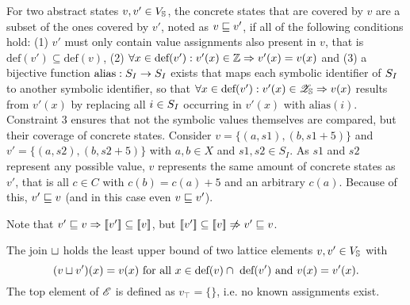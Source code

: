 For two abstract states $v, v' \in V_{\mathbb{S}}$, the concrete states that are covered by $v$ are a subset of the ones covered by $v'$, noted as $v \sqsubseteq v'$, if all of the following conditions hold:
(1) $v'$ must only contain value assignments also present in $v$, that is $\text{def}(v') \subseteq \text{def}(v)$,
(2) $\forall x \in \text{def}(v'): v'(x) \in \mathbb{Z} \Rightarrow v'(x) = v(x)$ and
(3) a bijective function $\text{alias}:S_I \rightarrow S_I$ exists
that maps each symbolic identifier of $S_I$ to another symbolic identifier,
so that $\forall x \in \text{def}(v'): v'(x) \in \mathscr{Z}_{\mathbb{S}} \Rightarrow v(x)$ results from $v'(x)$ by replacing all $i \in S_I$ occurring in $v'(x)$ with $\text{alias}(i)$.
Constraint 3 ensures that not the symbolic values themselves are compared, but their coverage of concrete states.
Consider $v = \{ (a, s1), (b, s1 + 5) \}$ and $v' = \{ (a, s2), (b, s2 + 5) \}$ with $a, b \in X$ and $s1, s2 \in S_I$. As $s1$ and $s2$ represent any possible value, $v$ represents the same amount of concrete states as $v'$, that is all $c \in C$ with $c(b) = c(a) + 5$ and an arbitrary $c(a)$. Because of this, $v' \sqsubseteq v$ (and in this case even $v \sqsubseteq v'$).

Note that $v' \sqsubseteq v \Rightarrow [\![ v' ]\!] \subseteq [\![ v ]\!]$,
but $\llbracket v' \rrbracket \subseteq \llbracket v \rrbracket \centernot\Rightarrow v' \lesserEqual v$.

The join $\sqcup$ holds the least upper bound of two lattice elements $v, v' \in V_{\mathbb{S}}$ with
  \[ (v \sqcup v')(x) = v(x) \text{ for all } x \in \text{def}(v) \cap\ \text{def}(v') \text{ and } v(x) = v'(x) \text{.} \]
The top element of $\mathscr{E}$ is defined as $v_\top = \{\}$, i.e. no known assignments exist.

